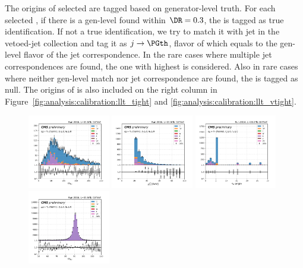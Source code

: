 The origins of selected \PGth are tagged based on generator-level truth. For each selected \PGth, if there is a gen-level \PGth found within $\DR = 0.3$, the \PGth is tagged as true identification.  If not a true identification, we try to match it with jet in the vetoed-jet collection and tag it as $j \to \PGth$, flavor of which equals to the gen-level flavor of the jet correspondence.  In the rare cases where multiple jet correspondences are found, the one with highest \pt is considered.  Also in rare cases where neither gen-level \PGth match nor jet correspondence are found, the \PGth is tagged as null. The origins of \PGth is also included on the right column in Figure~\ref{fig:analysis:calibration:llt_tight} and \ref{fig:analysis:calibration:llt_vtight}.
\begin{figure}
    \centering
    \includegraphics[width=0.32\textwidth]{chapters/Analysis/sectionCalibration/figures/jetToTauh/emutau_dilepton_mass_pickles_lltauTight.png}
    \includegraphics[width=0.32\textwidth]{chapters/Analysis/sectionCalibration/figures/jetToTauh/emutau_tauPt_pickles_lltauTight.png}
    \includegraphics[width=0.32\textwidth]{chapters/Analysis/sectionCalibration/figures/jetToTauh/emutau_tauGenFlavor_pickles_lltauTight.png}
    \includegraphics[width=0.32\textwidth]{chapters/Analysis/sectionCalibration/figures/jetToTauh/mumutau_dilepton_mass_pickles_lltauTight.png}

\end{figure}
